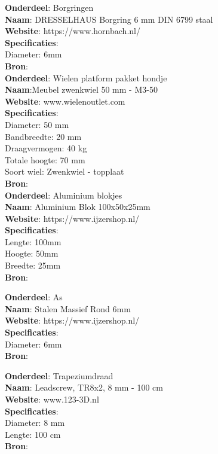 \textbf{Onderdeel}: Borgringen \\
\textbf{Naam}: DRESSELHAUS Borgring 6 mm DIN 6799 staal \\
\textbf{Website}: https://www.hornbach.nl/ \\
\textbf{Specificaties}: \\
Diameter: 6mm \\
\textbf{Bron}: \cite{hornbach}\\

\textbf{Onderdeel}: Wielen platform pakket hondje\\
\textbf{Naam}:Meubel zwenkwiel 50 mm - M3-50\\
\textbf{Website}: www.wielenoutlet.com\\
\textbf{Specificaties}:\\
Diameter: 50 mm\\
Bandbreedte: 20 mm\\
Draagvermogen: 40 kg\\
Totale hoogte: 70 mm\\
Soort wiel: Zwenkwiel - topplaat\\
\textbf{Bron}: \cite{wielenoutlet}\\

\textbf{Onderdeel}: Aluminium blokjes \\
\textbf{Naam}: Aluminium Blok 100x50x25mm \\
\textbf{Website}: https://www.ijzershop.nl/ \\
\textbf{Specificaties}: \\
Lengte: 100mm \\
Hoogte: 50mm \\
Breedte: 25mm \\
\textbf{Bron}: \cite{ijzershop.nl} \\
\vspace{\baselineskip}

\textbf{Onderdeel}: As \\
\textbf{Naam}: Stalen Massief Rond 6mm\\
\textbf{Website}: https://www.ijzershop.nl/\\
\textbf{Specificaties}:\\
Diameter: 6mm\\
\textbf{Bron}: \cite{ijzershop.nl}\\
\vspace{\baselineskip}

\textbf{Onderdeel}: Trapeziumdraad\\
\textbf{Naam}: Leadscrew, TR8x2, 8 mm - 100 cm\\
\textbf{Website}: www.123-3D.nl\\
\textbf{Specificaties}:\\
Diameter:	8 mm\\	
Lengte:	100 cm\\
\textbf{Bron}: \cite{123}\\
\vspace{\baselineskip}\\


